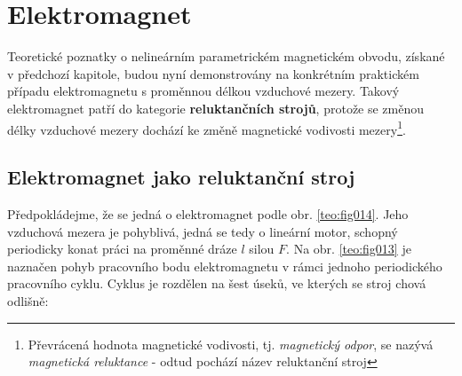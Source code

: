   \section{Elektromagnet}
    Teoretické poznatky o nelineárním parametrickém magnetickém obvodu, získané v předchozí 
    kapitole, budou nyní demonstrovány na konkrétním praktickém případu elektromagnetu s proměnnou 
    délkou vzduchové mezery. Takový elektromagnet patří do kategorie \textbf{reluktančních strojů}, 
    protože se změnou délky vzduchové mezery dochází ke změně magnetické vodivosti 
    mezery\footnote{Převrácená hodnota magnetické vodivosti, tj.\emph{ magnetický odpor}, se nazývá 
    \emph{magnetická reluktance} - odtud pochází název reluktanční stroj}.

    \subsection{Elektromagnet jako reluktanční stroj}
      Předpokládejme, že se jedná o elektromagnet podle obr. \ref{teo:fig014}. Jeho vzduchová 
      mezera je pohyblivá, jedná se tedy o lineární motor, schopný periodicky konat práci na 
      proměnné dráze \(l\) silou \(F\). Na obr. \ref{teo:fig013} je naznačen pohyb pracovního bodu 
      elektromagnetu v rámci jednoho periodického pracovního cyklu. Cyklus je rozdělen na šest 
      úseků, ve kterých se stroj chová odlišně:
      
